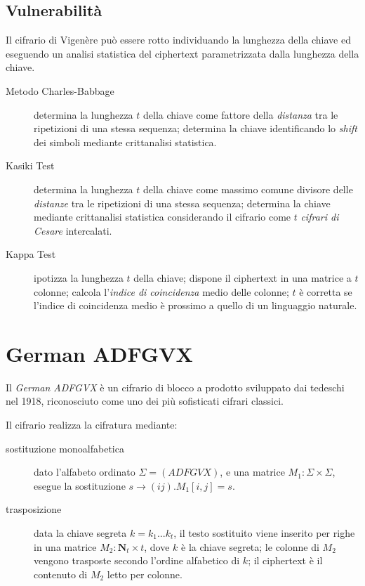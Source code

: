 \subsection{Vulnerabilità}
Il cifrario di Vigenère può essere rotto individuando la lunghezza della chiave ed eseguendo un analisi statistica del ciphertext parametrizzata dalla lunghezza della chiave.

\begin{description}
  \item[Metodo Charles-Babbage] determina la lunghezza $t$ della chiave come fattore della \textit{distanza} tra le ripetizioni di una stessa sequenza; determina la chiave identificando lo \textit{shift} dei simboli mediante crittanalisi statistica.
  \item[Kasiki Test] determina la lunghezza $t$ della chiave come massimo comune divisore delle \textit{distanze} tra le ripetizioni di una stessa sequenza; determina la chiave mediante crittanalisi statistica considerando il cifrario come $t$ \textit{cifrari di Cesare} intercalati.
  \item[Kappa Test] ipotizza la lunghezza $t$ della chiave; dispone il ciphertext in una matrice a $t$ colonne; calcola l'\textit{indice di coincidenza} medio delle colonne; $t$ è corretta se l'indice di coincidenza medio è prossimo a quello di un linguaggio naturale.
\end{description}


\section{German ADFGVX}
Il \textit{German ADFGVX} è un cifrario di blocco a prodotto sviluppato dai tedeschi nel 1918, riconosciuto come uno dei più sofisticati cifrari classici.

Il cifrario realizza la cifratura mediante:
\begin{description}
  \item[sostituzione monoalfabetica] dato l'alfabeto ordinato $\Sigma=(ADFGVX)$, e una matrice $M_{1}:\Sigma \times \Sigma$, esegue la sostituzione $s \rightarrow (ij).M_{1}[i,j]=s$.

  \item[trasposizione] data la chiave segreta $k=k_{1}...k_{t}$, il testo sostituito viene inserito per righe in una matrice $M_{2}:\mathbf{N}_{t} \times t$, dove $k$ è la chiave segreta; le colonne di $M_{2}$ vengono trasposte secondo l'ordine alfabetico di $k$; il ciphertext è il contenuto di $M_{2}$ letto per colonne.
\end{description}


